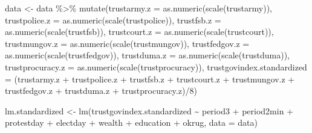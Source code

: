 \documentclass[
  letterpaper,
  DIV=11,
  numbers=noendperiod]{scrartcl}
\newenvironment{Shaded}{\begin{snugshade}}{\end{snugshade}}
\newcommand{\AttributeTok}[1]{\textcolor[rgb]{0.40,0.45,0.13}{#1}}
\newcommand{\DecValTok}[1]{\textcolor[rgb]{0.68,0.00,0.00}{#1}}
\newcommand{\FunctionTok}[1]{\textcolor[rgb]{0.28,0.35,0.67}{#1}}
\newcommand{\NormalTok}[1]{\textcolor[rgb]{0.00,0.23,0.31}{#1}}
\newcommand{\OtherTok}[1]{\textcolor[rgb]{0.00,0.23,0.31}{#1}}
\newcommand{\SpecialCharTok}[1]{\textcolor[rgb]{0.37,0.37,0.37}{#1}}
\begin{document}
\begin{Shaded}
\begin{Highlighting}[]
\NormalTok{data }\OtherTok{\textless{}{-}}\NormalTok{ data }\SpecialCharTok{\%\textgreater{}\%} 
  \FunctionTok{mutate}\NormalTok{(}\AttributeTok{trustarmy.z =} \FunctionTok{as.numeric}\NormalTok{(}\FunctionTok{scale}\NormalTok{(trustarmy)),}
         \AttributeTok{trustpolice.z =} \FunctionTok{as.numeric}\NormalTok{(}\FunctionTok{scale}\NormalTok{(trustpolice)),}
         \AttributeTok{trustfsb.z =} \FunctionTok{as.numeric}\NormalTok{(}\FunctionTok{scale}\NormalTok{(trustfsb)),}
         \AttributeTok{trustcourt.z =} \FunctionTok{as.numeric}\NormalTok{(}\FunctionTok{scale}\NormalTok{(trustcourt)),}
         \AttributeTok{trustmungov.z =} \FunctionTok{as.numeric}\NormalTok{(}\FunctionTok{scale}\NormalTok{(trustmungov)),}
         \AttributeTok{trustfedgov.z =} \FunctionTok{as.numeric}\NormalTok{(}\FunctionTok{scale}\NormalTok{(trustfedgov)),}
         \AttributeTok{trustduma.z =} \FunctionTok{as.numeric}\NormalTok{(}\FunctionTok{scale}\NormalTok{(trustduma)),}
         \AttributeTok{trustprocuracy.z =} \FunctionTok{as.numeric}\NormalTok{(}\FunctionTok{scale}\NormalTok{(trustprocuracy)),}
         \AttributeTok{trustgovindex.standardized =}\NormalTok{ (trustarmy.z }\SpecialCharTok{+}\NormalTok{ trustpolice.z }\SpecialCharTok{+}\NormalTok{ trustfsb.z }\SpecialCharTok{+}
\NormalTok{                                         trustcourt.z }\SpecialCharTok{+}\NormalTok{ trustmungov.z }\SpecialCharTok{+}\NormalTok{ trustfedgov.z }\SpecialCharTok{+}
\NormalTok{                                         trustduma.z }\SpecialCharTok{+}\NormalTok{ trustprocuracy.z)}\SpecialCharTok{/}\DecValTok{8}\NormalTok{)}

\NormalTok{lm.standardized }\OtherTok{\textless{}{-}} \FunctionTok{lm}\NormalTok{(trustgovindex.standardized }\SpecialCharTok{\textasciitilde{}}\NormalTok{ period3 }\SpecialCharTok{+}\NormalTok{ period2min }\SpecialCharTok{+}\NormalTok{ protestday }\SpecialCharTok{+} 
\NormalTok{                           electday }\SpecialCharTok{+}\NormalTok{ wealth }\SpecialCharTok{+}\NormalTok{ education }\SpecialCharTok{+}\NormalTok{ okrug, }\AttributeTok{data =}\NormalTok{ data)}


\end{Highlighting}
\end{Shaded}
\end{document}
